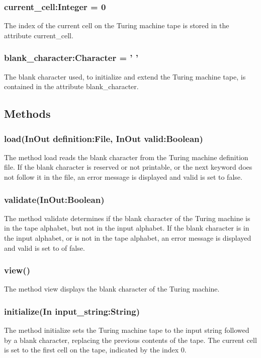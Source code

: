 \documentclass{report}
\begin{document}
    \subsubsection{ current\_cell:Integer = 0 }
    The index of the current cell on the Turing machine tape is stored in the attribute current\_cell.
    
    \subsubsection{blank\_character:Character = ' ' }
    The blank character used, to initialize and extend the Turing machine tape, is contained in the attribute blank\_character.
    \subsection{Methods} 
    
    \subsubsection{load(InOut definition:File, InOut valid:Boolean)}
    The method load reads the blank character from the Turing machine definition file. If the blank character is reserved or not printable, or the next keyword does not follow it in the file, an error message is displayed and valid is set to false.
    
    \subsubsection{validate(InOut:Boolean)}
    The method validate determines if the blank character of the Turing machine is in the tape alphabet, but not in the input alphabet. If the blank character is in the input alphabet, or is not in the tape alphabet, an error message is displayed and valid is set to of false.
    
    \subsubsection{view()}
    The method view displays the blank character of the Turing machine.
    
    \subsubsection{initialize(In input\_string:String)}
    The method initialize sets the Turing machine tape to the input string followed by a blank character, replacing the previous contents of the tape. The current cell is set to the first cell on the tape, indicated by the index 0.
    
\end{document}

